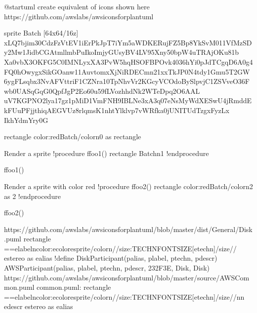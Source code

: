 \documentclass[letterpaper,10pt,english]{sphinxmanual}
\begin{document}
\begin{sphinxVerbatim}[commandchars=\\\{\},numbers=left,firstnumber=1,stepnumber=1]
@startuml
\PYGZsq{}create equivalent of icons shown here https://github.com/awslabs/aws\PYGZhy{}icons\PYGZhy{}for\PYGZhy{}plantuml


sprite \PYGZdl{}Batch [64x64/16z] \PYGZob{}
xLQ7bjim30CdzFzVtEV1iErPkJpT7iYm5aWDKERujFZ5Bp8YkSvM011VfMzSDy2Mw1JidbCGAtmllmbPuIkoImjyGUsyBV4LV95\PYGZus{}Xny50bpW4uTRAjOKu81b
Xa0vbX3OKFG5C0IMNLyxXA\PYGZus{}3PvW5hqHSOFBP\PYGZus{}Ovk4036hYi0pJdTCgqD6A0g4FQ0hOwygxSikGOanw11AuvtomxXjNiRDECmn21xxTkJP0N4tdy1Gmu5T2GW
6ygFL\PYGZus{}sqbx3NvA\PYGZus{}FVtt\PYGZus{}ri\PYGZus{}F1CZNra\PYGZhy{}10TpNhvVr2KGcyVCOdoBySlpv\PYGZhy{}jC1ZSVveO36\PYGZus{}Fwb0UASqGqG0QpfJgP2Eo60u59\PYGZhy{}fLVozhhdNk2WTeDpq2O6AAL\PYGZus{}
uV7KGPNO2lya17gz1pMiD1VmFNH9IBLNe3xA3q07eNsMy\PYGZus{}WdXESwU4jRmddEk\PYGZhy{}FUuPFjjthiqAEGVUz8rlqmsK1nhtYlklvp7vWRfka0jUNITUdTzgxFyzLx
\PYGZhy{}Ikh\PYGZus{}YdmYr\PYGZus{}y0G
\PYGZcb{}


rectangle \PYGZdq{}\PYGZlt{}color:red\PYGZgt{}\PYGZlt{}\PYGZdl{}Batch\PYGZgt{}\PYGZlt{}/color\PYGZgt{}\PYGZbs{}n0\PYGZdq{}  as rectangle


\PYGZsq{}Render a sprite
!procedure \PYGZdl{}ffoo1()
    rectangle \PYGZdq{}\PYGZlt{}\PYGZdl{}Batch\PYGZgt{}\PYGZbs{}n1\PYGZdq{}
!endprocedure

\PYGZdl{}ffoo1()


\PYGZsq{}Render a sprite \PYGZhy{} with color red
!procedure \PYGZdl{}ffoo2()
    rectangle \PYGZdq{}\PYGZlt{}color:red\PYGZgt{}\PYGZlt{}\PYGZdl{}Batch\PYGZgt{}\PYGZlt{}/color\PYGZgt{}\PYGZbs{}n2\PYGZdq{} as 2
!endprocedure

\PYGZdl{}ffoo2()


\PYGZsq{}https://github.com/awslabs/aws\PYGZhy{}icons\PYGZhy{}for\PYGZhy{}plantuml/blob/master/dist/General/Disk.puml
\PYGZsq{}rectangle \PYGZdq{}==e\PYGZus{}label\PYGZbs{}n\PYGZlt{}color:e\PYGZus{}color\PYGZgt{}\PYGZlt{}\PYGZdl{}e\PYGZus{}sprite\PYGZgt{}\PYGZlt{}/color\PYGZgt{}\PYGZbs{}n//\PYGZlt{}size:TECHN\PYGZus{}FONT\PYGZus{}SIZE\PYGZgt{}[e\PYGZus{}techn]\PYGZlt{}/size\PYGZgt{}//\PYGZdq{} \PYGZlt{}\PYGZlt{}e\PYGZus{}stereo\PYGZgt{}\PYGZgt{} as e\PYGZus{}alias
\PYGZsq{}!define DiskParticipant(p\PYGZus{}alias, p\PYGZus{}label, p\PYGZus{}techn, p\PYGZus{}descr) AWSParticipant(p\PYGZus{}alias, p\PYGZus{}label, p\PYGZus{}techn, p\PYGZus{}descr, \PYGZsh{}232F3E, Disk, Disk)
\PYGZsq{}https://github.com/awslabs/aws\PYGZhy{}icons\PYGZhy{}for\PYGZhy{}plantuml/blob/master/source/AWSCommon.puml
\PYGZsq{}common.puml: rectangle \PYGZdq{}==e\PYGZus{}label\PYGZbs{}n\PYGZlt{}color:e\PYGZus{}color\PYGZgt{}\PYGZlt{}\PYGZdl{}e\PYGZus{}sprite\PYGZgt{}\PYGZlt{}/color\PYGZgt{}\PYGZbs{}n//\PYGZlt{}size:TECHN\PYGZus{}FONT\PYGZus{}SIZE\PYGZgt{}[e\PYGZus{}techn]\PYGZlt{}/size\PYGZgt{}//\PYGZbs{}n\PYGZbs{}n e\PYGZus{}descr\PYGZdq{} \PYGZlt{}\PYGZlt{}e\PYGZus{}stereo\PYGZgt{}\PYGZgt{} as e\PYGZus{}alias



\end{sphinxVerbatim}
\end{document}
